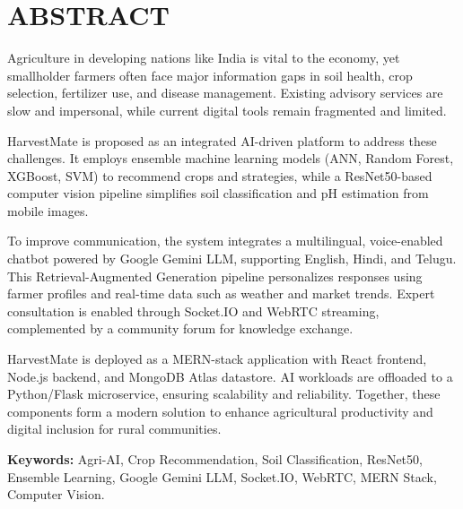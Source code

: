 \documentclass[12pt,a4paper]{report}
\begin{document}
\chapter*{ABSTRACT}

Agriculture in developing nations like India is vital to the economy, yet smallholder farmers often face major information gaps in soil health, crop selection, fertilizer use, and disease management. Existing advisory services are slow and impersonal, while current digital tools remain fragmented and limited.  

HarvestMate is proposed as an integrated AI-driven platform to address these challenges. It employs ensemble machine learning models (ANN, Random Forest, XGBoost, SVM) to recommend crops and strategies, while a ResNet50-based computer vision pipeline simplifies soil classification and pH estimation from mobile images.  

To improve communication, the system integrates a multilingual, voice-enabled chatbot powered by Google Gemini LLM, supporting English, Hindi, and Telugu. This Retrieval-Augmented Generation pipeline personalizes responses using farmer profiles and real-time data such as weather and market trends. Expert consultation is enabled through Socket.IO and WebRTC streaming, complemented by a community forum for knowledge exchange.  

HarvestMate is deployed as a MERN-stack application with React frontend, Node.js backend, and MongoDB Atlas datastore. AI workloads are offloaded to a Python/Flask microservice, ensuring scalability and reliability. Together, these components form a modern solution to enhance agricultural productivity and digital inclusion for rural communities.  

\noindent\textbf{Keywords:} Agri-AI, Crop Recommendation, Soil Classification, ResNet50, Ensemble Learning, Google Gemini LLM, Socket.IO, WebRTC, MERN Stack, Computer Vision.

\clearpage

\tableofcontents
{}
\clearpage

\listoffigures
{}
\clearpage

\listoftables
{}
\clearpage
\end{document}
